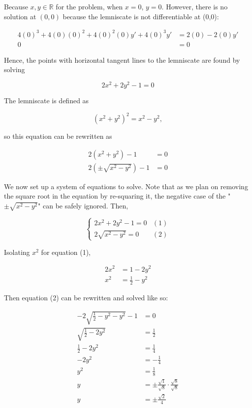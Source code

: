 \documentclass{article}
\begin{document}
    Because $x,y\in\mathbb{R}$ for the problem, when $x=0$, $y=0$. However, there is no solution at $(0,0)$ because the lemniscate is not differentiable at (0,0):

    \begin{align*}
        4(0)^3 + 4(0)(0)^2 + 4(0)^2(0) y' + 4(0)^3 y'   &= 2(0) - 2(0) y' \\
        0                                               &= 0
    \end{align*}

    \pagebreak
    \thispagestyle{page12}

    Hence, the points with horizontal tangent lines to the lemniscate are found by solving

    \[
        2x^2 + 2y^2 - 1 = 0
    \]

    The lemniscate is defined as

    \[
        (x^2+y^2)^2 = x^2 - y^2,
    \]

    so this equation can be rewritten as

    \begin{align*}
        2(x^2 + y^2) - 1    &= 0 \\
        2(\pm\sqrt{x^2 - y^2}) - 1  &= 0
    \end{align*}

    We now set up a system of equations to solve. Note that as we plan on removing the square root in the equation by re-squaring it, the negative case of the "$\pm\sqrt{x^2-y^2}$" can be safely ignored. Then,

    \[
        \begin{cases}
            2x^2 + 2y^2 - 1 = 0    & (1) \\
            2\sqrt{x^2 - y^2} = 0  & (2)
        \end{cases}
    \]

    Isolating $x^2$ for equation (1),

    \begin{align*}
        2x^2    &= 1-2y^2 \\
        x^2     &= \frac{1}{2} - y^2
    \end{align*}

    Then equation (2) can be rewritten and solved like so:

    \begin{align*}
        -2 \sqrt{\frac{1}{2}-y^2-y^2}-1    &= 0 \\
        \sqrt{\frac{1}{2}-2y^2}            &= \frac{1}{2} \\
        \frac{1}{2}-2y^2                   &= \frac{1}{4} \\
        -2y^2                              &= -\frac{1}{4} \\
        y^2                                &= \frac{1}{8} \\
        y                                  &= \pm \frac{\sqrt{1}}{\sqrt{8}} \cdot \frac{\sqrt{8}}{\sqrt{8}} \\
        y                                  &= \pm \frac{\sqrt{2}}{4}
    \end{align*}
\end{document}
